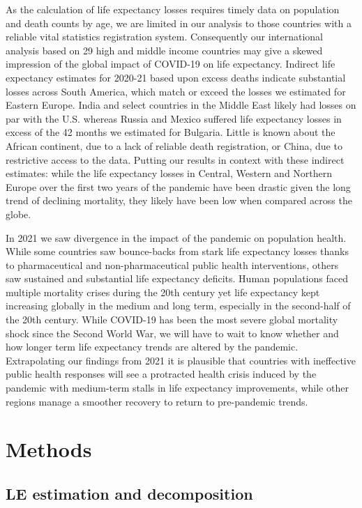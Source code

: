 \documentclass[12pt]{article}
\begin{document}
As the calculation of life expectancy losses requires timely data on population and death counts by age, we are limited in our analysis to those countries with a reliable vital statistics registration system. Consequently our international analysis based on 29 high and middle income countries may give a skewed impression of the global impact of COVID-19 on life expectancy. Indirect life expectancy estimates for 2020-21 based upon excess deaths \citealp{Heuveline2022} indicate substantial losses across South America, which match or exceed the losses we estimated for Eastern Europe. India and select countries in the Middle East likely had losses on par with the U.S. whereas Russia and Mexico suffered life expectancy losses in excess of the 42 months we estimated for Bulgaria. Little is known about the African continent, due to a lack of reliable death registration, or China, due to restrictive access to the data. Putting our results in context with these indirect estimates: while the life expectancy losses in Central, Western and Northern Europe over the first two years of the pandemic have been drastic given the long trend of declining mortality, they likely have been low when compared across the globe.

In 2021 we saw divergence in the impact of the pandemic on population health. While some countries saw bounce-backs from stark life expectancy losses thanks to pharmaceutical and non-pharmaceutical public health interventions, others saw sustained and substantial life expectancy deficits. Human populations faced multiple mortality crises during the 20th century yet life expectancy kept increasing globally in the medium and long term, especially in the second-half of the 20th century. While COVID-19 has been the most severe global mortality shock since the Second World War, we will have to wait to know  whether and how longer term life expectancy trends are altered by the pandemic. Extrapolating our findings from 2021 it is plausible that countries with ineffective public health responses will see a protracted health crisis induced by the pandemic with medium-term stalls in life expectancy improvements, while other regions manage a smoother recovery to return to pre-pandemic trends.

\section*{Methods}

\subsection*{LE estimation and decomposition}
\end{document}
